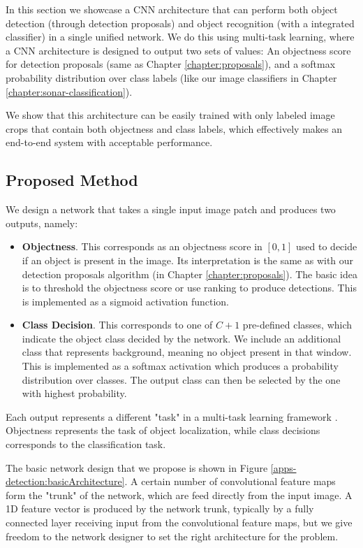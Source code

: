 In this section we showcase a CNN architecture that can perform both object detection (through detection proposals) and object recognition (with a integrated classifier) in a single unified network. We do this using multi-task learning, where a CNN architecture is designed to output two sets of values: An objectness score for detection proposals (same as Chapter \ref{chapter:proposals}), and a softmax probability distribution over class labels (like our image classifiers in Chapter \ref{chapter:sonar-classification}).

We show that this architecture can be easily trained with only labeled image crops that contain both objectness and class labels, which effectively makes an end-to-end system with acceptable performance.

\subsection{Proposed Method}

We design a network that takes a single input image patch and produces two outputs, namely:

\begin{itemize}
	\item \textbf{Objectness}. This corresponds as an objectness score in $[0, 1]$ used to decide if an object is present in the image. Its interpretation is the same as with our detection proposals algorithm (in Chapter \ref{chapter:proposals}). The basic idea is to threshold the objectness score or use ranking to produce detections. This is implemented as a sigmoid activation function.
	\item \textbf{Class Decision}. This corresponds to one of $C + 1$ pre-defined classes, which indicate the object class decided by the network. We include an additional class that represents background, meaning no object present in that window. This is implemented as a softmax activation which produces a probability distribution over classes. The output class can then be selected by the one with highest probability.
\end{itemize}

Each output represents a different "task" in a multi-task learning framework \cite{ruder2017overview}. Objectness represents the task of object localization, while class decisions corresponds to the classification task.

The basic network design that we propose is shown in Figure \ref{apps-detection:basicArchitecture}. A certain number of convolutional feature maps form the "trunk" of the network, which are feed directly from the input image. A 1D feature vector is produced by the network trunk, typically by a fully connected layer receiving input from the convolutional feature maps, but we give freedom to the  network designer to set the right architecture for the problem.

